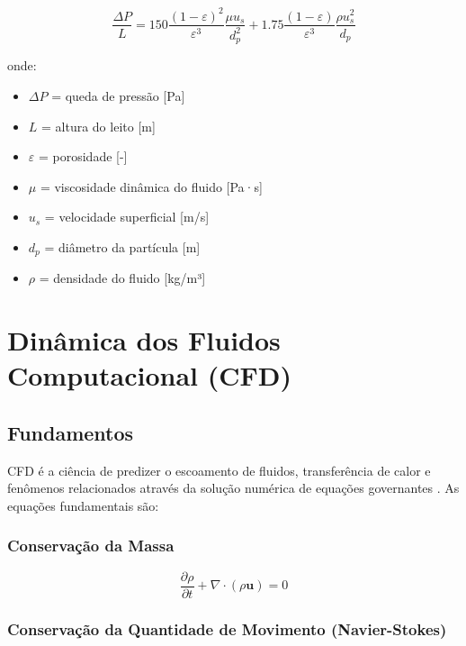 \begin{equation}
\frac{\Delta P}{L} = 150 \frac{(1-\varepsilon)^2}{\varepsilon^3} \frac{\mu u_s}{d_p^2} + 1.75 \frac{(1-\varepsilon)}{\varepsilon^3} \frac{\rho u_s^2}{d_p}
\label{eq:ergun}
\end{equation}

onde:
\begin{itemize}
    \item $\Delta P$ = queda de pressão [Pa]
    \item $L$ = altura do leito [m]
    \item $\varepsilon$ = porosidade [-]
    \item $\mu$ = viscosidade dinâmica do fluido [Pa·s]
    \item $u_s$ = velocidade superficial [m/s]
    \item $d_p$ = diâmetro da partícula [m]
    \item $\rho$ = densidade do fluido [kg/m³]
\end{itemize}

\section{Dinâmica dos Fluidos Computacional (CFD)}

\subsection{Fundamentos}

CFD é a ciência de predizer o escoamento de fluidos, transferência de calor e fenômenos relacionados através da solução numérica de equações governantes \cite{versteeg2007}. As equações fundamentais são:

\subsubsection{Conservação da Massa}

\begin{equation}
\frac{\partial \rho}{\partial t} + \nabla \cdot (\rho \mathbf{u}) = 0
\label{eq:continuidade}
\end{equation}

\subsubsection{Conservação da Quantidade de Movimento (Navier-Stokes)}

